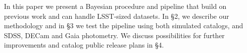 In this paper we present a Bayesian procedure and pipeline that build on previous work and can handle LSST-sized datasets.
In \S2, we describe our methodology and in \S3 we test the pipeline using both simulated catalogs, and SDSS, DECam and Gaia
photometry. We discuss possibilities for further improvements and catalog public release plans in \S4. 
